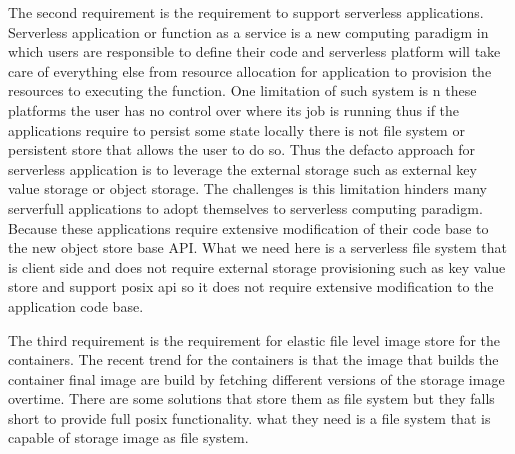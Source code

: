 The second requirement is the requirement to support serverless applications. 
Serverless application or function as a service is a new computing paradigm in which users are responsible to define their code and serverless platform will take care of everything else from resource allocation for application to provision the resources to executing the function. 
One limitation of such system is n these platforms the user has no control over where its job is running thus if the applications require to persist some state locally there is not file system or persistent store that allows the user to do so.
Thus the defacto approach for serverless application is to leverage the external storage such as external key value storage or object storage. 
The challenges is this limitation hinders many serverfull applications to adopt themselves to serverless computing paradigm. Because these applications require extensive modification of their code base to the new object store base API.  
What we need here is a serverless file system that is client side and does not require external storage provisioning such as key value store and support posix api so it does not require extensive modification to the application code base. 



The third requirement is the requirement for elastic file level image store for the containers. 
The recent trend for the containers is that the image that builds the container final image are build by fetching different versions of the storage image overtime. 
There are some solutions that store them as file system but they falls short to provide full posix functionality. 
what they need is a file system that is capable of storage image as file system. 





















